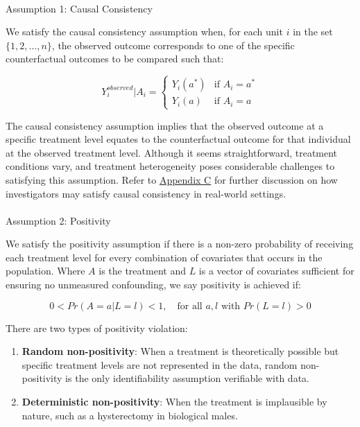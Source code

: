 \documentclass[
  single column]{article}
\makeatletter
\let\oldparagraph\paragraph
\renewcommand{\paragraph}{
    \@ifstar
      \xxxParagraphStar
      \xxxParagraphNoStar
  }
\newcommand{\xxxParagraphStar}[1]{\oldparagraph*{#1}\mbox{}}
\newcommand{\xxxParagraphNoStar}[1]{\oldparagraph{#1}\mbox{}}
\providecommand{\tightlist}{%
  \setlength{\itemsep}{0pt}\setlength{\parskip}{0pt}}\usepackage{longtable,booktabs,array}
\makeatother
\begin{document}
\paragraph{Assumption 1: Causal
Consistency}\label{assumption-1-causal-consistency}

We satisfy the causal consistency assumption when, for each unit \(i\)
in the set \(\{1, 2, \ldots, n\}\), the observed outcome corresponds to
one of the specific counterfactual outcomes to be compared such that:

\[
Y_i^{observed}|A_i = 
\begin{cases} 
Y_i(a^*) & \text{if } A_i = a^* \\
Y_i(a) & \text{if } A_i = a
\end{cases}
\]

The causal consistency assumption implies that the observed outcome at a
specific treatment level equates to the counterfactual outcome for that
individual at the observed treatment level. Although it seems
straightforward, treatment conditions vary, and treatment heterogeneity
poses considerable challenges to satisfying this assumption. Refer to
\hyperref[id-app-c]{Appendix C} for further discussion on how
investigators may satisfy causal consistency in real-world settings.

\paragraph{Assumption 2: Positivity}\label{assumption-2-positivity}

We satisfy the positivity assumption if there is a non-zero probability
of receiving each treatment level for every combination of covariates
that occurs in the population. Where \(A\) is the treatment and \(L\) is
a vector of covariates sufficient for ensuring no unmeasured
confounding, we say positivity is achieved if:

\[
0 < Pr(A = a | L = l) < 1, \quad \text{for all } a, l \text{ with } Pr(L = l) > 0
\]

There are two types of positivity violation:

\begin{enumerate}
\def\labelenumi{\arabic{enumi}.}
\tightlist
\item
  \textbf{Random non-positivity}: When a treatment is theoretically
  possible but specific treatment levels are not represented in the
  data, random non-positivity is the only identifiability assumption
  verifiable with data.
\item
  \textbf{Deterministic non-positivity}: When the treatment is
  implausible by nature, such as a hysterectomy in biological males.
\end{enumerate}
\end{document}
